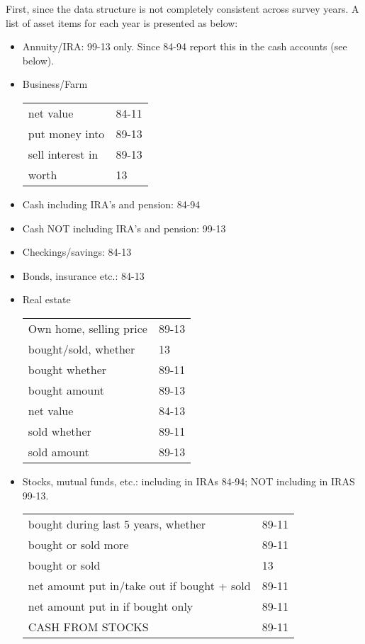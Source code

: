 \documentclass[12pt,notitlepage]{article}%
\begin{document}
First, since the data structure is not completely consistent across survey years. A list of asset items for each year is presented as below:
\begin{itemize}
\item Annuity/IRA: 99-13 only. Since 84-94 report this in the cash accounts (see below).

\item Business/Farm

\begin{tabular}{ll}
net value & 84-11 \\
put money into & 89-13 \\
sell interest in & 89-13 \\
worth & 13 \\
\end{tabular}

\item Cash including IRA's and pension: 84-94
\item Cash NOT including IRA's and pension: 99-13

\item Checkings/savings: 84-13

\item Bonds, insurance etc.: 84-13

\item Real estate

\begin{tabular}{ll}
Own home, selling price & 89-13 \\
bought/sold, whether & 13 \\
bought whether & 89-11 \\
bought amount & 89-13 \\ 
net value & 84-13 \\ 
sold whether & 89-11 \\
sold amount & 89-13 \\
\end{tabular}

\item Stocks, mutual funds, etc.: including in IRAs 84-94; NOT including in IRAS 99-13.

\begin{tabular}{ll}
bought during last 5 years, whether & 89-11 \\
bought or sold more & 89-11 \\
bought or sold & 13\\
net amount put in/take out if bought + sold & 89-11\\
net amount put in if bought only & 89-11\\
CASH FROM STOCKS & 89-11\\
\end{tabular}

\end{itemize}
\end{document}
